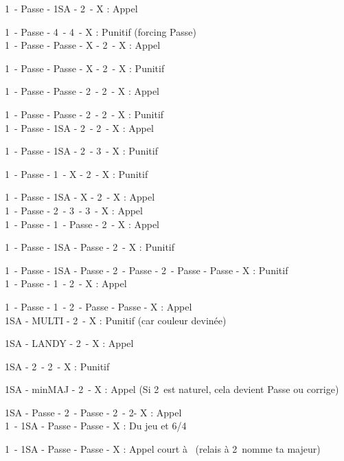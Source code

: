 \documentclass[a4paper, oneside, 11pt]{report}
\begin{document}
		1\carreau\ - Passe - 1SA - 2\pique\ - X : Appel
		
		1\coeur\ - Passe - 4\coeur\ - 4\pique\ - X : Punitif (forcing Passe)\\
		
		1\pique\ - Passe - Passe - X - 2\pique\ - X : Appel
		
		1\pique\ - Passe - Passe - X - 2\trefle\ - X : Punitif
		
		1\pique\ - Passe - Passe - 2\coeur\ - 2\pique\ - X : Appel
		
		1\pique\ - Passe - Passe - 2\carreau\ - 2\coeur\ - X : Punitif\\
		
		1\pique\ - Passe - 1SA - 2\coeur\ - 2\pique\ - X : Appel
		
		1\pique\ - Passe - 1SA - 2\coeur\ - 3\carreau\ - X : Punitif
		
		1\carreau\ - Passe - 1\coeur\ - X - 2\carreau\ - X : Punitif
		
		1\carreau\ - Passe - 1SA - X - 2\carreau\ - X : Appel\\
		
		1\coeur\ - Passe - 2\coeur\ - 3\carreau\ - 3\coeur\ - X : Appel\\
		
		1\coeur\ - Passe - 1\pique\ - Passe - 2\coeur\ - X : Appel
		
		1\coeur\ - Passe - 1SA - Passe - 2\coeur\ - X : Punitif
		
		1\coeur\ - Passe - 1SA - Passe - 2\trefle\ - Passe - 2\coeur\ - Passe - Passe - X : Punitif\\
		
		1\carreau\ - Passe - 1\coeur\ - 2\coeur\ - X : Appel
		
		1\carreau\ - Passe - 1\coeur\ - 2\coeur\ - Passe - Passe - X : Appel\\
		
		1SA - MULTI - 2\coeur\ - X : Punitif (car couleur devinée)
		
		1SA - LANDY - 2\carreau\ - X : Appel
		
		1SA - 2\coeur\ - 2\pique\ - X : Punitif
		
		1SA - minMAJ - 2\trefle\ - X : Appel (Si 2\trefle\ est naturel, cela devient Passe ou corrige)
		
		1SA - Passe - 2\carreau\ - Passe - 2\coeur\ - 2\pique - X : Appel\\
		
		
		
		1\coeur\ - 1SA - Passe - Passe - X : Du jeu et 6\coeur/4\pique
		
		1\trefle\ - 1SA - Passe - Passe - X : Appel court à \carreau\ (relais à 2\carreau\ nomme ta majeur)
\end{document}
